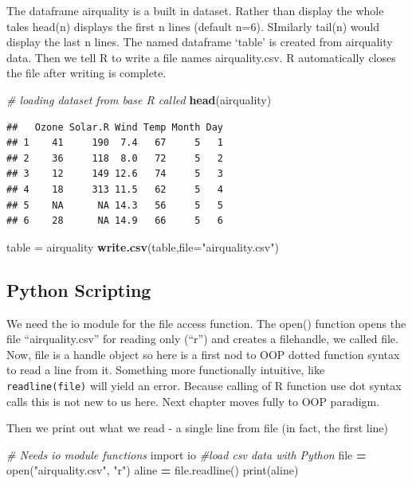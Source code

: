 \documentclass[]{book}
\newenvironment{Shaded}{\begin{snugshade}}{\end{snugshade}}
\newcommand{\KeywordTok}[1]{\textcolor[rgb]{0.13,0.29,0.53}{\textbf{#1}}}
\newcommand{\DataTypeTok}[1]{\textcolor[rgb]{0.13,0.29,0.53}{#1}}
\newcommand{\StringTok}[1]{\textcolor[rgb]{0.31,0.60,0.02}{#1}}
\newcommand{\ImportTok}[1]{#1}
\newcommand{\CommentTok}[1]{\textcolor[rgb]{0.56,0.35,0.01}{\textit{#1}}}
\newcommand{\OperatorTok}[1]{\textcolor[rgb]{0.81,0.36,0.00}{\textbf{#1}}}
\newcommand{\BuiltInTok}[1]{#1}
\newcommand{\NormalTok}[1]{#1}
\theoremstyle{definition}
\theoremstyle{definition}
\theoremstyle{definition}
\theoremstyle{remark}
\begin{document}
The dataframe airquality is a built in dataset. Rather than display the
whole tales head(n) displays the first n lines (default n=6). SImilarly
tail(n) would display the last n lines. The named dataframe `table' is
created from airquality data. Then we tell R to write a file names
airquality.csv. R automatically closes the file after writing is
complete.

\begin{Shaded}
\begin{Highlighting}[]
\CommentTok{# loading dataset from base R called }
\KeywordTok{head}\NormalTok{(airquality)}
\end{Highlighting}
\end{Shaded}

\begin{verbatim}
##   Ozone Solar.R Wind Temp Month Day
## 1    41     190  7.4   67     5   1
## 2    36     118  8.0   72     5   2
## 3    12     149 12.6   74     5   3
## 4    18     313 11.5   62     5   4
## 5    NA      NA 14.3   56     5   5
## 6    28      NA 14.9   66     5   6
\end{verbatim}

\begin{Shaded}
\begin{Highlighting}[]
\NormalTok{table =}\StringTok{ }\NormalTok{airquality}
\KeywordTok{write.csv}\NormalTok{(table,}\DataTypeTok{file=}\StringTok{"airquality.csv"}\NormalTok{)}
\end{Highlighting}
\end{Shaded}

\subsection{Python Scripting}\label{python-scripting-3}

We need the io module for the file access function. The open() function
opens the file ``airquality.csv'' for reading only (``r'') and creates a
filehandle, we called file. Now, file is a handle object so here is a
first nod to OOP dotted function syntax to read a line from it.
Something more functionally intuitive, like \texttt{readline(file)} will
yield an error. Because calling of R function use dot syntax calls this
is not new to us here. Next chapter moves fully to OOP paradigm.

Then we print out what we read - a single line from file (in fact, the
first line)

\begin{Shaded}
\begin{Highlighting}[]
\CommentTok{# Needs io module functions}
\ImportTok{import}\NormalTok{ io}
\CommentTok{#load csv data with Python }
\BuiltInTok{file} \OperatorTok{=} \BuiltInTok{open}\NormalTok{(}\StringTok{"airquality.csv"}\NormalTok{, }\StringTok{"r"}\NormalTok{)}
\NormalTok{aline }\OperatorTok{=} \BuiltInTok{file}\NormalTok{.readline()}
\BuiltInTok{print}\NormalTok{(aline)}
\end{Highlighting}
\end{Shaded}
\end{document}
